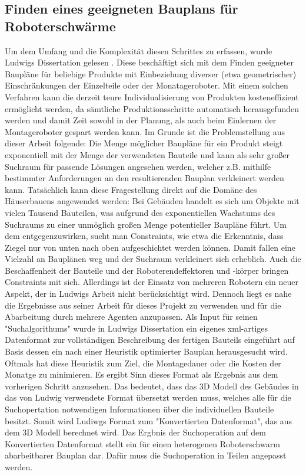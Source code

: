 \subsection{Finden eines geeigneten Bauplans für Roboterschwärme}
Um dem Umfang und die Komplexität diesen Schrittes zu erfassen, wurde Ludwigs Dissertation gelesen \cite{Naegele2021}.
Diese beschäftigt sich mit dem Finden geeigneter Baupläne für beliebige Produkte mit Einbeziehung diverser (etwa geometrischer) Einschränkungen der Einzelteile oder der Monatageroboter.
Mit einem solchen Verfahren kann die derzeit teure Individualisierung von Produkten kosteneffizient ermöglicht werden, da sämtliche Produktionsschritte automatisch herausgefunden werden und damit Zeit sowohl in der Planung, als auch beim Einlernen der Montageroboter gespart werden kann.
Im Grunde ist die Problemstellung aus dieser Arbeit folgende:
Die Menge möglicher Baupläne für ein Produkt steigt exponentiell mit der Menge der verwendeten Bauteile und kann als sehr großer Suchraum für passende Lösungen angesehen werden, welcher z.B. mithilfe bestimmter Anforderungen an den resultierenden Bauplan verkleinert werden kann.
Tatsächlich kann diese Fragestellung direkt auf die Domäne des Häuserbauens angewendet werden:
Bei Gebäuden handelt es sich um Objekte mit vielen Tausend Bauteilen, was aufgrund des exponentiellen Wachstums des Suchraums zu einer unmöglich großen Menge potentieller Baupläne führt.
Um dem entgegenzuwirken, sucht man Constraints, wie etwa die Erkenntnis, dass Ziegel nur von unten nach oben aufgeschichtet werden können.
Damit fallen eine Vielzahl an Bauplänen weg und der Suchraum verkleinert sich erheblich.
Auch die Beschaffenheit der Bauteile und der Roboterendeffektoren und -körper bringen Constraints mit sich.
Allerdings ist der Einsatz von mehreren Robotern ein neuer Aspekt, der in Ludwigs Arbeit nicht berücksichtigt wird.
Dennoch liegt es nahe die Ergebnisse aus seiner Arbeit für dieses Projekt zu verwenden und für die Abarbeitung durch mehrere Agenten anzupassen.
Als Input für seinen "Suchalgorithums" wurde in Ludwigs Dissertation ein eigenes xml-artiges Datenformat zur vollständigen Beschreibung des fertigen Bauteils eingeführt auf Basis dessen ein nach einer Heuristik optimierter Bauplan herausgesucht wird.
Oftmals hat diese Heuristik zum Ziel, die Montagedauer oder die Kosten der Monatge zu minimieren.
Es ergibt Sinn dieses Format als Ergebnis aus dem vorherigen Schritt anzusehen.
Das bedeutet, dass das 3D Modell des Gebäudes in das von Ludwig verwendete Format übersetzt werden muss, welches alle für die Suchopertation notwendigen Informationen über die individuellen Bauteile besitzt.
Somit wird Ludiwgs Format zum "Konvertierten Datenformat", das aus dem 3D Modell berechnet wird.
Das Ergbnis der Suchoperation auf dem Konvertierten Datenformat stellt ein für einen heterogenen Roboterschwarm abarbeitbarer Bauplan dar.
Dafür muss die Suchoperation in Teilen angepasst werden.

